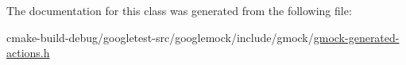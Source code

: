 The documentation for this class was generated from the following file\+:\begin{DoxyCompactItemize}
\item 
cmake-\/build-\/debug/googletest-\/src/googlemock/include/gmock/\mbox{\hyperlink{gmock-generated-actions_8h}{gmock-\/generated-\/actions.\+h}}\end{DoxyCompactItemize}
